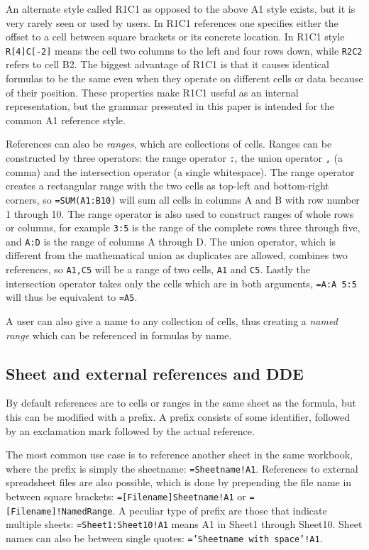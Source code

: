 \documentclass[conference]{IEEEtran}
\begin{document}
An alternate style called R1C1 as opposed to the above A1 style exists, but it is very rarely seen or used by users.
In R1C1 references one specifies either the offset to a cell between square brackets or its concrete location.
In R1C1 style \texttt{R[4]C[-2]} means the cell two columns to the left and four rows down, while \texttt{R2C2} refers to cell B2.
The biggest advantage of R1C1 is that it causes identical formulas to be the same even when they operate on different cells or data because of their position.
These properties make R1C1 useful as an internal representation, but the grammar presented in this paper is intended for the common A1 reference style.

References can also be \emph{ranges}, which are collections of cells.
Ranges can be constructed by three operators: the range operator \texttt{:}, the union operator \texttt{,} (a comma) and the intersection operator \texttt{} (a single whitespace).
The range operator creates a rectangular range with the two cells as top-left and bottom-right corners, so \texttt{=SUM(A1:B10)} will sum all cells in columns A and B with row number 1 through 10.
The range operator is also used to construct ranges of whole rows or columns, for example \texttt{3:5} is the range of the complete rows three through five, and \texttt{A:D} is the range of columns A through D.
The union operator, which is different from the mathematical union as duplicates are allowed, combines two references, so \texttt{A1,C5} will be a range of two cells, \texttt{A1} and \texttt{C5}.
Lastly the intersection operator takes only the cells which are in both arguments, \texttt{=A:A 5:5} will thus be equivalent to \texttt{=A5}.

A user can also give a name to any collection of cells, thus creating a \emph{named range} which can be referenced in formulas by name.

\subsection{Sheet and external references and DDE}
\label{subsection:ExternalRefsDDE}

By default references are to cells or ranges in the same sheet as the formula, but this can be modified with a prefix. A prefix consists of some identifier, followed by an exclamation mark followed by the actual reference.

The most common use case is to reference another sheet in the same workbook, where the prefix is simply the sheetname: \texttt{=Sheetname!A1}. References to external spreadsheet files are also possible, which is done by prepending the file name in between square brackets: \texttt{=[Filename]Sheetname!A1} or \texttt{=[Filename]!NamedRange}.
A peculiar type of prefix are those that indicate multiple sheets: \texttt{=Sheet1:Sheet10!A1} means A1 in Sheet1 through Sheet10.
Sheet names can also be between single quotes: \texttt{='Sheetname with space'!A1}. 
\end{document}
